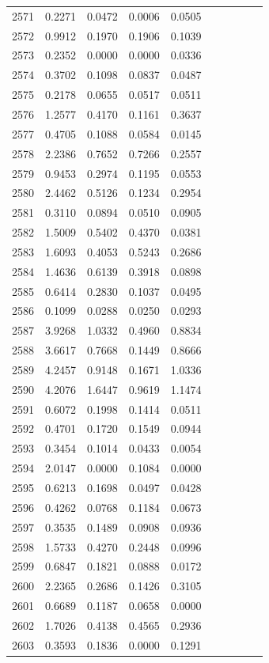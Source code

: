 \begin{table}
\begin{tabular}{cccccccccc}
2571& 0.2271& 0.0472& 0.0006& 0.0505\\ 
2572& 0.9912& 0.1970& 0.1906& 0.1039\\ 
2573& 0.2352& 0.0000& 0.0000& 0.0336\\ 
2574& 0.3702& 0.1098& 0.0837& 0.0487\\ 
2575& 0.2178& 0.0655& 0.0517& 0.0511\\ 
2576& 1.2577& 0.4170& 0.1161& 0.3637\\ 
2577& 0.4705& 0.1088& 0.0584& 0.0145\\ 
2578& 2.2386& 0.7652& 0.7266& 0.2557\\ 
2579& 0.9453& 0.2974& 0.1195& 0.0553\\ 
2580& 2.4462& 0.5126& 0.1234& 0.2954\\ 
2581& 0.3110& 0.0894& 0.0510& 0.0905\\ 
2582& 1.5009& 0.5402& 0.4370& 0.0381\\ 
2583& 1.6093& 0.4053& 0.5243& 0.2686\\ 
2584& 1.4636& 0.6139& 0.3918& 0.0898\\ 
2585& 0.6414& 0.2830& 0.1037& 0.0495\\ 
2586& 0.1099& 0.0288& 0.0250& 0.0293\\ 
2587& 3.9268& 1.0332& 0.4960& 0.8834\\ 
2588& 3.6617& 0.7668& 0.1449& 0.8666\\ 
2589& 4.2457& 0.9148& 0.1671& 1.0336\\ 
2590& 4.2076& 1.6447& 0.9619& 1.1474\\ 
2591& 0.6072& 0.1998& 0.1414& 0.0511\\ 
2592& 0.4701& 0.1720& 0.1549& 0.0944\\ 
2593& 0.3454& 0.1014& 0.0433& 0.0054\\ 
2594& 2.0147& 0.0000& 0.1084& 0.0000\\ 
2595& 0.6213& 0.1698& 0.0497& 0.0428\\ 
2596& 0.4262& 0.0768& 0.1184& 0.0673\\ 
2597& 0.3535& 0.1489& 0.0908& 0.0936\\ 
2598& 1.5733& 0.4270& 0.2448& 0.0996\\ 
2599& 0.6847& 0.1821& 0.0888& 0.0172\\ 
2600& 2.2365& 0.2686& 0.1426& 0.3105\\ 
2601& 0.6689& 0.1187& 0.0658& 0.0000\\ 
2602& 1.7026& 0.4138& 0.4565& 0.2936\\ 
2603& 0.3593& 0.1836& 0.0000& 0.1291\\ 

\end{tabular}
\end{table}
